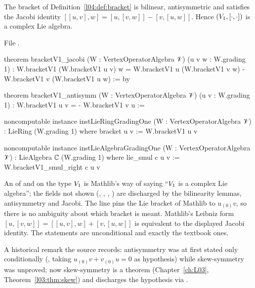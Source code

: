 \begin{theorem}\label{l04:thm:lie}
The bracket of Definition~\ref{l04:def:bracket} is bilinear, antisymmetric and satisfies the
Jacobi identity $[[u,v],w] = [u,[v,w]] - [v,[u,w]]$. Hence $(V_1,[\cdot,\cdot])$ is a complex
Lie algebra.
\end{theorem}
\noindent File .
\begin{leancode}
theorem bracketV1_jacobi (W : VertexOperatorAlgebra 𝒱) (u v w : W.grading 1) :
    W.bracketV1 (W.bracketV1 u v) w
      = W.bracketV1 u (W.bracketV1 v w) - W.bracketV1 v (W.bracketV1 u w) := by

theorem bracketV1_antisymm (W : VertexOperatorAlgebra 𝒱) (u v : W.grading 1) :
    W.bracketV1 u v = - W.bracketV1 v u :=

noncomputable instance instLieRingGradingOne (W : VertexOperatorAlgebra 𝒱) :
    LieRing (W.grading 1) where
  bracket u v := W.bracketV1 u v

noncomputable instance instLieAlgebraGradingOne (W : VertexOperatorAlgebra 𝒱) :
    LieAlgebra ℂ (W.grading 1) where
  lie_smul c u v := W.bracketV1_smul_right c u v
\end{leancode}
\begin{dictionary}
An  of  and  on the type $V_1$ is Mathlib's way
of saying ``$V_1$ is a complex Lie algebra''; the fields not shown (,
, , ) are discharged by the bilinearity lemmas,
antisymmetry and Jacobi. The line  pins the Lie bracket
 of Mathlib to $u_{(0)}v$, so there is no ambiguity about which bracket is meant.
Mathlib's Leibniz form $[u,[v,w]] = [[u,v],w] + [v,[u,w]]$ is equivalent to the displayed Jacobi
identity. The statements are unconditional and exactly the textbook ones.

A historical remark the source records: antisymmetry was at first stated only conditionally
(\allowbreak{}\allowbreak{}\allowbreak{}, taking $u_{(0)}v+v_{(0)}u = 0$ as hypothesis) while
skew-symmetry was unproved; now skew-symmetry is a theorem (Chapter~\ref{ch:L03}, Theorem~\ref{l03:thm:skew}) and
\allowbreak{} discharges the hypothesis via \allowbreak{}\allowbreak{}\allowbreak{}\allowbreak{}\allowbreak{}.
\end{dictionary}
